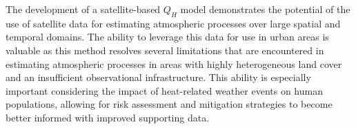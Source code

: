 The development of a satellite-based $Q_H$ model demonstrates the potential of the use of satellite data for estimating atmospheric processes over large spatial and temporal domains. The ability to leverage this data for use in urban areas is valuable as this method resolves several limitations that are encountered in estimating atmospheric processes in areas with highly heterogeneous land cover and an insufficient observational infrastructure. This ability is especially important considering the impact of heat-related weather events on human populations, allowing for risk assessment and mitigation strategies to become better informed with improved supporting data.

